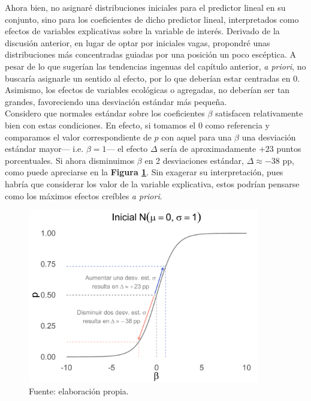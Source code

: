 Ahora bien, no asignaré distribuciones iniciales para el predictor lineal en su conjunto, sino para los coeficientes de dicho predictor lineal, interpretados como efectos de variables explicativas sobre la variable de interés. Derivado de la discusión anterior, en lugar de optar por iniciales vagas, propondré unas distribuciones más concentradas guiadas por una posición un poco escéptica. A pesar de lo que sugerían las tendencias ingenuas del capítulo anterior, \textit{a priori}, no buscaría asignarle un sentido al efecto, por lo que deberían estar centradas en $0$. Asimismo, los efectos de variables ecológicas o agregadas, no deberían ser tan grandes, favoreciendo una desviación estándar más pequeña.\\ 

Considero que normales estándar sobre los coeficientes $\beta$ satisfacen relativamente bien con estas condiciones. En efecto, si tomamos el $0$ como referencia y comparamos el valor correspondiente de $p$ con aquel para una $\beta$ una desviación estándar mayor--- i.e. $\beta = 1$--- el efecto $\Delta$ sería de aproximadamente $+23$ puntos porcentuales. Si ahora disminuimos $\beta$ en 2 desviaciones estándar,  $\Delta \approx -38$ pp, como puede apreciarse en la \textbf{Figura \ref{fig:Inicial_Coef}}. Sin exagerar su interpretación, pues habría que considerar los valor de la variable explicativa, estos podrían pensarse como los máximos efectos creíbles \textit{a priori}.\\ 

\begin{figure}[h]
	\centering
	\includegraphics[width = 0.9\textwidth]{Figs/Modelado/Inicial_N0_uno}
	\caption{Fuente: elaboración propia.}
	\label{fig:Inicial_Coef}
\end{figure}

